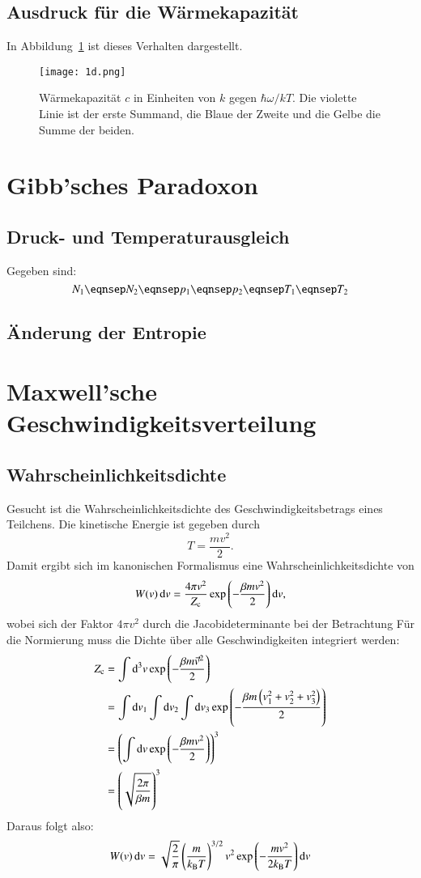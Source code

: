 \subsection{Ausdruck für die Wärmekapazität}

In Abbildung~\ref{fig:1d-c} ist dieses Verhalten dargestellt.

\begin{figure}[htbp]
    \centering
    \texttt{[image: 1d.png]}
    \caption{%
        Wärmekapazität $c$ in Einheiten von $k$ gegen $\hbar\omega / kT$. Die
        violette Linie ist der erste Summand, die Blaue der Zweite und die
        Gelbe die Summe der beiden.
    }
    \label{fig:1d-c}
\end{figure}

\section{Gibb'sches Paradoxon}

\subsection{Druck- und Temperaturausgleich}

Gegeben sind:
\[
    N_1
    \eqnsep
    N_2
    \eqnsep
    p_1
    \eqnsep
    p_2
    \eqnsep
    T_1
    \eqnsep
    T_2
\]


\subsection{Änderung der Entropie}

\section{Maxwell'sche Geschwindigkeitsverteilung}

\subsection{Wahrscheinlichkeitsdichte}
Gesucht ist die Wahrscheinlichkeitsdichte des Geschwindigkeitsbetrags eines Teilchens. Die kinetische Energie ist gegeben durch
\[T=\frac{mv^2}{2}.\]
Damit ergibt sich im kanonischen Formalismus eine Wahrscheinlichkeitsdichte von
\[W(v) \dif v = \frac{4\pi v^2}{Z_\text c} \exp\del{-\frac{\beta mv^2}{2}} \dif v, \]
wobei sich der Faktor $4\pi v^2$ durch die Jacobideterminante bei der Betrachtung
Für die Normierung muss die Dichte über alle Geschwindigkeiten integriert werden:
\begin{align*}
Z_\text c &= \int \dif{}^3v \exp\del{-\frac{\beta m\vec{v}^2}{2}} \\
&= \int\dif v_1 \int\dif v_2 \int\dif v_3 \exp\del{-\frac{\beta m \del{ v_1^2+v_2^2+v_3^2}}{2}} \\
&= \del{\int \dif v \exp\del{-\frac{\beta m{v}^2}{2}}}^3 \\
&= \del{\sqrt{\frac{2\pi}{\beta m}}}^3
\end{align*}
Daraus folgt also:
\[W(v) \dif v = \sqrt{\frac{2}{\pi}} \del{\frac{m}{k_\text B T}}^{3/2} v^2 \exp\del{-\frac{mv^2}{2k_\text BT}} \dif v \]

